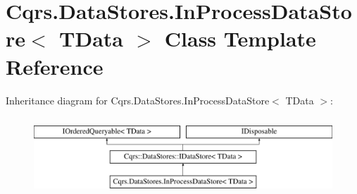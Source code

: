 \hypertarget{classCqrs_1_1DataStores_1_1InProcessDataStore}{}\section{Cqrs.\+Data\+Stores.\+In\+Process\+Data\+Store$<$ T\+Data $>$ Class Template Reference}
\label{classCqrs_1_1DataStores_1_1InProcessDataStore}
Inheritance diagram for Cqrs.\+Data\+Stores.\+In\+Process\+Data\+Store$<$ T\+Data $>$\+:\begin{figure}[H]
\begin{center}
\leavevmode
\includegraphics[height=2.947368cm]{classCqrs_1_1DataStores_1_1InProcessDataStore}
\end{center}
\end{figure}
